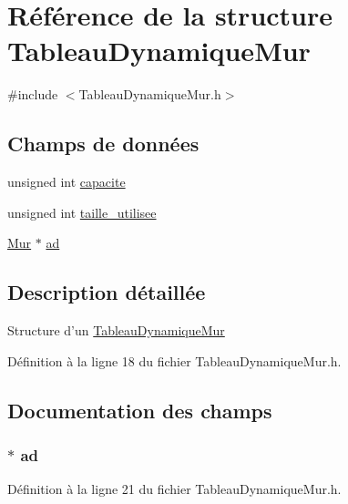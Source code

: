 \hypertarget{struct_tableau_dynamique_mur}{\section{Référence de la structure Tableau\-Dynamique\-Mur}
\label{struct_tableau_dynamique_mur}
}


{\ttfamily \#include $<$Tableau\-Dynamique\-Mur.\-h$>$}

\subsection*{Champs de données}
\begin{DoxyCompactItemize}
\item 
unsigned int \hyperlink{struct_tableau_dynamique_mur_ac3e3c7196292bbc416a904d29ee638c8}{capacite}
\item 
unsigned int \hyperlink{struct_tableau_dynamique_mur_aaf681889cbd00b7c45951f63b10f969a}{taille\-\_\-utilisee}
\item 
\hyperlink{struct_mur}{Mur} $\ast$ \hyperlink{struct_tableau_dynamique_mur_aa31f6d67d92d25be568d951218e93438}{ad}
\end{DoxyCompactItemize}


\subsection{Description détaillée}
Structure d'un \hyperlink{struct_tableau_dynamique_mur}{Tableau\-Dynamique\-Mur} 

Définition à la ligne 18 du fichier Tableau\-Dynamique\-Mur.\-h.



\subsection{Documentation des champs}
\hypertarget{struct_tableau_dynamique_mur_aa31f6d67d92d25be568d951218e93438}{
\subsubsection[{ad}]{$\ast$ ad}}\label{struct_tableau_dynamique_mur_aa31f6d67d92d25be568d951218e93438}


Définition à la ligne 21 du fichier Tableau\-Dynamique\-Mur.\-h.


